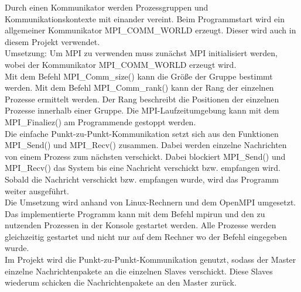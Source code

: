 Durch einen Kommunikator werden Prozessgruppen und Kommunikationskontexte mit einander vereint. Beim Programmstart wird ein allgemeiner Kommunikator MPI\_COMM\_WORLD erzeugt. Dieser wird auch in diesem Projekt verwendet.\\
Umsetzung: Um MPI zu verwenden muss zunächst MPI initialisiert werden, wobei der  Kommunikator MPI\_COMM\_WORLD erzeugt wird. \\
Mit dem Befehl MPI\_Comm\_size() kann die Größe der Gruppe bestimmt werden. Mit dem Befehl MPI\_Comm\_rank() kann der Rang der einzelnen Prozesse ermittelt werden. Der Rang beschreibt die Positionen der einzelnen Prozesse innerhalb einer Gruppe.
Die MPI-Laufzeitumgebung kann mit dem MPI\_Finaliez() am Programmende gestoppt werden.\\
Die einfache Punkt-zu-Punkt-Kommunikation setzt sich aus den Funktionen MPI\_Send() und MPI\_Recv() zusammen. Dabei werden einzelne Nachrichten von einem Prozess zum nächsten verschickt. Dabei blockiert MPI\_Send() und MPI\_Recv() das System bis eine Nachricht verschickt bzw. empfangen wird. Sobald die Nachricht verschickt bzw. empfangen wurde, wird das Programm weiter ausgeführt. \\
Die Umsetzung wird anhand von Linux-Rechnern und dem OpenMPI umgesetzt. Das implementierte Programm kann mit dem Befehl mpirun und den zu nutzenden Prozessen in der Konsole gestartet werden. Alle Prozesse werden gleichzeitig gestartet und nicht nur auf dem Rechner wo der Befehl eingegeben wurde.\\
Im Projekt wird die Punkt-zu-Punkt-Kommunikation genutzt, sodass der Master einzelne Nachrichtenpakete an die einzelnen Slaves verschickt. Diese Slaves wiederum schicken die Nachrichtenpakete an den Master zurück.\cite{b1} \\